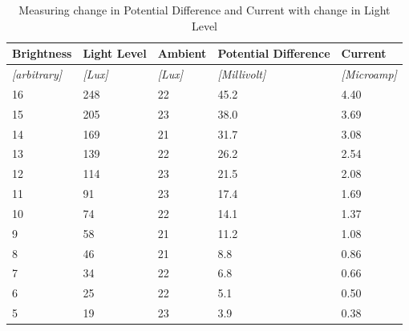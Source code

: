 \documentclass{article}
\begin{document}
\begin{table}[!ht]
\centering
\caption{Measuring change in Potential Difference and Current with change in Light Level}
\label{my-label}
\begin{tabular}{|l|l|l|l|l|}
\hline
\textbf{Brightness}      & \textbf{Light Level} & \textbf{Ambient}   & \textbf{Potential Difference} & \textbf{Current}        \\ \hline
\textit{{[}arbitrary{]}} & \textit{{[}Lux{]}}   & \textit{{[}Lux{]}} & \textit{{[}Millivolt{]}}      & \textit{{[}Microamp{]}} \\ \hline
16                       & 248                  & 22                 & 45.2                          & 4.40                    \\ \hline
15                       & 205                  & 23                 & 38.0                          & 3.69                    \\ \hline
14                       & 169                  & 21                 & 31.7                          & 3.08                    \\ \hline
13                       & 139                  & 22                 & 26.2                          & 2.54                    \\ \hline
12                       & 114                  & 23                 & 21.5                          & 2.08                    \\ \hline
11                       & 91                   & 23                 & 17.4                          & 1.69                    \\ \hline
10                       & 74                   & 22                 & 14.1                          & 1.37                    \\ \hline
9                        & 58                   & 21                 & 11.2                          & 1.08                    \\ \hline
8                        & 46                   & 21                 & 8.8                           & 0.86                    \\ \hline
7                        & 34                   & 22                 & 6.8                           & 0.66                    \\ \hline
6                        & 25                   & 22                 & 5.1                           & 0.50                    \\ \hline
5                        & 19                   & 23                 & 3.9                           & 0.38                    \\ \hline

\end{tabular}
\end{table}
\end{document}
